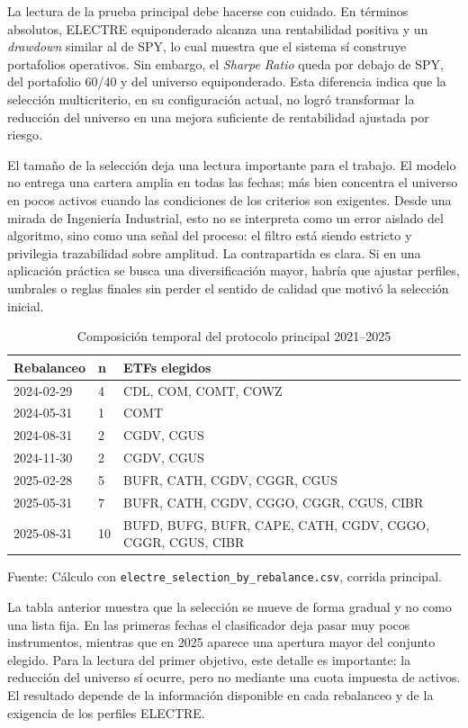 \documentclass[12pt,letterpaper]{article}
\newcommand{\fuente}[1]{\begin{center}\small Fuente: #1\end{center}}
\begin{document}
La lectura de la prueba principal debe hacerse con cuidado. En términos absolutos, ELECTRE equiponderado alcanza una rentabilidad positiva y un \textit{drawdown} similar al de SPY, lo cual muestra que el sistema sí construye portafolios operativos. Sin embargo, el \textit{Sharpe Ratio} queda por debajo de SPY, del portafolio 60/40 y del universo equiponderado. Esta diferencia indica que la selección multicriterio, en su configuración actual, no logró transformar la reducción del universo en una mejora suficiente de rentabilidad ajustada por riesgo.

El tamaño de la selección deja una lectura importante para el trabajo. El modelo no entrega una cartera amplia en todas las fechas; más bien concentra el universo en pocos activos cuando las condiciones de los criterios son exigentes. Desde una mirada de Ingeniería Industrial, esto no se interpreta como un error aislado del algoritmo, sino como una señal del proceso: el filtro está siendo estricto y privilegia trazabilidad sobre amplitud. La contrapartida es clara. Si en una aplicación práctica se busca una diversificación mayor, habría que ajustar perfiles, umbrales o reglas finales sin perder el sentido de calidad que motivó la selección inicial.

\begin{table}[H]
\centering
\caption{Composición temporal del protocolo principal 2021--2025}
\label{tab:composicion_temporal_principal}
\begin{tabular}{p{3cm}p{1.5cm}p{8.5cm}}
\toprule
\textbf{Rebalanceo} & \textbf{n} & \textbf{ETFs elegidos} \\
\midrule
2024-02-29 & 4 & CDL, COM, COMT, COWZ \\
2024-05-31 & 1 & COMT \\
2024-08-31 & 2 & CGDV, CGUS \\
2024-11-30 & 2 & CGDV, CGUS \\
2025-02-28 & 5 & BUFR, CATH, CGDV, CGGR, CGUS \\
2025-05-31 & 7 & BUFR, CATH, CGDV, CGGO, CGGR, CGUS, CIBR \\
2025-08-31 & 10 & BUFD, BUFG, BUFR, CAPE, CATH, CGDV, CGGO, CGGR, CGUS, CIBR \\
\bottomrule
\end{tabular}
\end{table}
\fuente{Cálculo con \texttt{electre\_selection\_by\_rebalance.csv}, corrida principal.}

La tabla anterior muestra que la selección se mueve de forma gradual y no como una lista fija. En las primeras fechas el clasificador deja pasar muy pocos instrumentos, mientras que en 2025 aparece una apertura mayor del conjunto elegido. Para la lectura del primer objetivo, este detalle es importante: la reducción del universo sí ocurre, pero no mediante una cuota impuesta de activos. El resultado depende de la información disponible en cada rebalanceo y de la exigencia de los perfiles ELECTRE.
\end{document}
